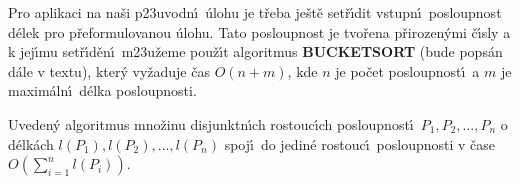 \documentclass[a4paper,12pt]{article}
\begin{document}
\flushpar Pro aplikaci na na\v si p\accent23uvodn\'\i\ \'ulohu je 
t\v reba  
je\v st\v e set\v r\'\i dit vstupn\'\i\ posloupnost d\'elek pro p\v reformu\-lo\-vanou \'ulohu.
Tato posloupnost je tvo\v rena p\v rirozen\'ymi \v c\'\i sly a 
k jej\'\i mu set\v r\'\i d\v en\'\i\  
m\accent23u\v zeme pou\v z\'\i t algoritmus {\bf BUCKETSORT} (bude 
pops\'an d\'ale v textu), kter\'y 
vy\v zaduje \v cas $O(n+m)$, kde $n$ je po\v cet posloupnost\'\i\ a $
m$ je 
maxim\'aln\'\i\ d\'elka posloupnosti.
\medskip

Uveden\'y algoritmus mno\v zinu 
disjunktn\'\i ch rostouc\'\i ch 
posloupnost\'\i\ $P_1,P_2,\dots,P_n$ o d\'elk\'ach $l(P_1),l(P_2)
,\dots,l(P_n)$ spoj\'\i\ 
do jedin\'e rostouc\'\i\ posloupnosti v \v case 
$O(\sum_{i=1}^nl(P_i))$.
\endproclaim
\bigskip

\centerline{}
\medskip
\end{document}
